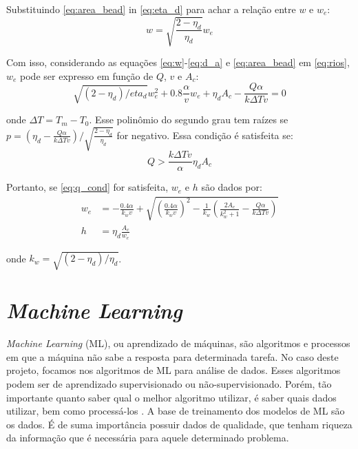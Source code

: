 Substituindo \ref{eq:area_bead} in \ref{eq:eta_d} para achar a relação entre $w$ e $w_e$:
\begin{equation}
    w = \sqrt{\frac{2-\eta_d}{\eta_d}}w_e
\end{equation}

Com isso, considerando as equações \ref{eq:w}-\ref{eq:d_a} e \ref{eq:area_bead} em \ref{eq:rios}, $w_e$ pode ser expresso em função de $Q$, $v$ e $A_c$:
\begin{equation}
    \sqrt{(2-\eta_d)/eta_d}w_e^2 + 0.8\frac{\alpha}{v}w_e + \eta_dA_c - \frac{Q\alpha}{k\Delta T v} = 0
\end{equation}

onde $\Delta T = T_m - T_0$. Esse polinômio do segundo grau tem raízes se $p = \left(\eta_d-\frac{Q\alpha}{k\Delta T v}\right)/\sqrt{\frac{2-\eta_d}{\eta_d}}$ for negativo. Essa condição é satisfeita se:
\begin{equation}
    Q > \frac{k\Delta T v}{\alpha} \eta_d A_c \label{eq:q_cond}
\end{equation}
 
Portanto, se \ref{eq:q_cond} for satisfeita, $w_e$ e $h$ são dados por:
\begin{align}
    w_e &= -\frac{0.4\alpha}{k_w v} + \sqrt{\left(\frac{0.4\alpha}{k_wv}\right)^2 - \frac{1}{k_w}\left(\frac{2A_c}{k_w^2+1} - \frac{Q\alpha}{k\Delta T v}\right)} \\
    h &= \eta_d \frac{A_c}{w_e}
\end{align}

onde $k_w = \sqrt{(2-\eta_d)/\eta_d}$.


\section{\textit{Machine Learning}}
\textit{Machine Learning} (ML), ou aprendizado de máquinas, são algoritmos e processos em que a máquina não sabe a resposta para determinada tarefa. No caso deste projeto, focamos nos algoritmos de ML para análise de dados. Esses algoritmos podem ser de aprendizado supervisionado ou não-supervisionado. Porém, tão importante quanto saber qual o melhor algoritmo utilizar, é saber quais dados utilizar, bem como processá-los \cite{alpaydin2020introduction}. A base de treinamento dos modelos de ML são os dados. É de suma importância possuir dados de qualidade, que tenham riqueza da informação que é necessária para aquele determinado problema. 

